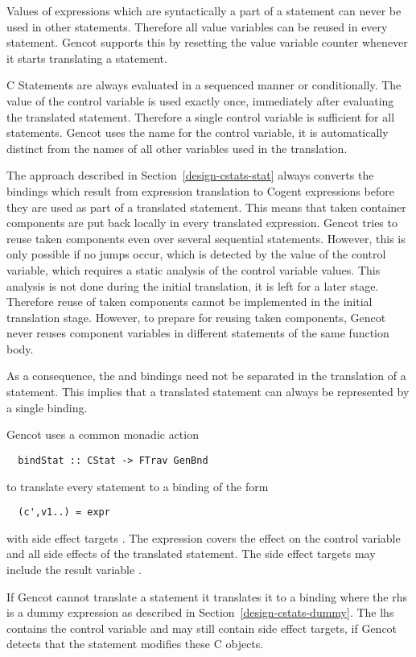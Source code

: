 Values of expressions which are syntactically a part of a statement can never be used in other statements. Therefore
all value variables can be reused in every statement. Gencot supports this by resetting the value variable counter 
whenever it starts translating a statement.

C Statements are always evaluated in a sequenced manner or conditionally. The value of the control variable is used exactly
once, immediately after evaluating the translated statement. Therefore a single control variable is sufficient for 
all statements. Gencot uses the name  for the control variable, it is automatically distinct from the names of
all other variables used in the translation.

The approach described in Section~\ref{design-cstats-stat} always converts the bindings which result from expression 
translation to Cogent expressions before they are used as part of a translated statement. This means that taken
container components are put back locally in every translated expression. Gencot tries to reuse taken components even 
over several sequential statements. However, this is only possible if no jumps occur, which is detected by the value
of the control variable, which requires a static analysis of the control variable values. This analysis is not done
during the initial translation, it is left for a later stage. Therefore reuse of taken components cannot be implemented
in the initial translation stage. However, to prepare for reusing taken components, Gencot never reuses component variables
in different statements of the same function body.

As a consequence, the  and  bindings need not be separated in the translation of a statement.
This implies that a translated statement can always be represented by a single binding.

Gencot uses a common monadic action 
\begin{verbatim}
  bindStat :: CStat -> FTrav GenBnd
\end{verbatim}
to translate every statement to a binding of the form
\begin{verbatim}
  (c',v1..) = expr
\end{verbatim}
with side effect targets . The expression  covers the effect on the control variable and 
all side effects of the translated statement. The side effect targets may include the result variable .

If Gencot cannot translate a statement it translates it to a binding where the rhs is a dummy expression as described in 
Section~\ref{design-cstats-dummy}. The lhs contains the control variable and may still contain side effect targets, if 
Gencot detects that the statement modifies these C objects.

